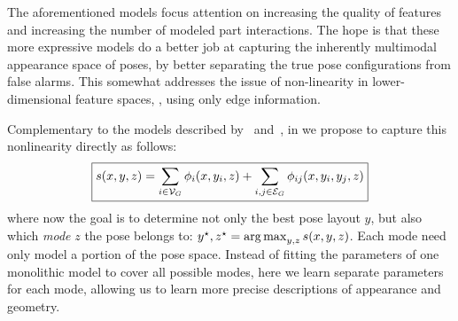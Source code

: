 The aforementioned models focus attention on increasing the quality of features 
and increasing the number of modeled part interactions.  The hope is that these 
more expressive models do a better job at capturing the inherently multimodal 
appearance space of poses, by better separating the true pose configurations 
from false alarms.  This somewhat addresses the issue of non-linearity in 
lower-dimensional feature spaces, \eg, using only edge information.

Complementary to the models described by~ 
and~, in  we propose to capture this nonlinearity 
directly as follows:
\begin{equation}
\boxed{s(x,y,z) =  \sum_{i \in \mathcal{V}_{G}} \phi_i(x,y_i,z) + \sum_{i,j \in 
\mathcal{E}_{G}} \phi_{ij}(x,y_i,y_j,z)}
\label{eq:contrib3}
\end{equation}
where now the goal is to determine not only the best pose layout $y$, but also 
which {\em mode} $z$ the pose belongs to: $y^\star,z^\star = \mathop{\arg\max}_{y,z} 
s(x,y,z)$.  Each mode need only model a portion of the pose space.  Instead of 
fitting the parameters of one monolithic model to cover all possible modes, 
here we learn separate parameters for each mode, allowing us to learn more 
precise descriptions of appearance and geometry.

